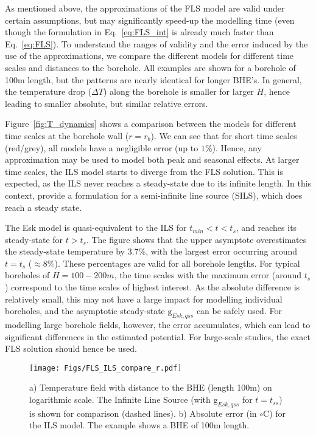 As mentioned above, the approximations of the FLS model are valid under certain assumptions, but may significantly speed-up the modelling time (even though the formulation in Eq.~\ref{eq:FLS_int} is already much faster than Eq.~\ref{eq:FLS}). To understand the ranges of validity and the error induced by the use of the approximations, we compare the different models for different time scales and distances to the borehole. All examples are shown for a borehole of 100m length, but the patterns are nearly identical for longer BHE's. In general, the temperature drop ($\Delta T$) along the borehole is smaller for larger $H$, hence leading to smaller absolute, but similar relative errors. 

Figure~\ref{fig:T_dynamics} shows a comparison between the models for different time scales at the borehole wall ($r = r_b$). We can see that for short time scales (red/grey), all models have a negligible error (up to $1\%$). 
Hence, any approximation may be used to model both peak and seasonal effects. At larger time scales, the ILS model starts to diverge from the FLS solution. 
This is expected, as the ILS never reaches a steady-state due to its infinite length. In this context, \citet{bandos_finite_2009} provide a formulation for a semi-infinite line source (SILS), which does reach a steady state. 

The Esk model is quasi-equivalent to the ILS for $t_{min} < t < t_s$, and reaches its steady-state for $t > t_s$. The figure shows that the upper asymptote overestimates the steady-state temperature by $3.7\%$, with the largest error occurring around $t = t_s$ ($\approx 8\%$). These percentages are valid for all borehole lengths. 
For typical boreholes of $H=100-200m$, the time scales with the maximum error (around $t_s$) correspond to the time scales of highest interest. 
As the absolute difference is relatively small, this may not have a large impact for modelling individual boreholes, and the asymptotic steady-state $\mathrm{g}_{Esk, qss}$ can be safely used. For modelling large borehole fields, however, the error accumulates, which can lead to significant differences in the estimated potential. For large-scale studies, the exact FLS solution should hence be used.

\begin{figure}[t]
    \centering
    \texttt{[image: Figs/FLS\_ILS\_compare\_r.pdf]}
    \caption{a) Temperature field with distance to the BHE (length 100m) on logarithmic scale. The Infinite Line Source (with $\mathrm{g}_{Esk, qss}$ for $t = t_{ss}$) is shown for comparison (dashed lines). b) Absolute error (in $\circ$C) for the ILS model. The example shows a BHE of 100m length.}
    \label{fig:r_field}
\end{figure}

